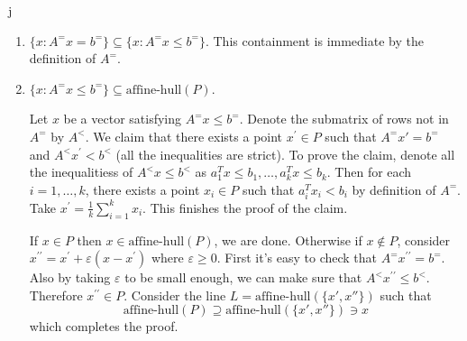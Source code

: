 j\documentclass[11pt]{article}
\renewcommand{\leq}{\leqslant}
\renewcommand{\geq}{\geqslant}
\begin{document}
\begin{enumerate}[1)]
\begin{solution}
\begin{enumerate}
\item $\{x : A^= x = b^=\} \subseteq \{x : A^= x \leq b^=\}$. This containment is immediate by the definition of $A^=$. 

\item $\{x : A^= x \leq b^=\} \subseteq \text{affine-hull}(P)$. 


Let  $x$ be a vector satisfying $ A^= x \leq b^=$. 
Denote the submatrix of rows not in $A^=$ by $A^<$. 
We claim that there exists a point $x^\prime \in P$ such that $A^= x' = b^=$ and $A^< x^\prime < b^<$ (all the inequalities are strict). To prove the claim, denote all the inequalitiess of $A^< x\leq b^<$ as $a_1^T x \leq b_1, \dots, a_k^T x \leq b_k$. Then for each $i = 1, \dots, k$, there exists a point $x_i \in P$ such that $a_i^T x_i < b_i$ by definition of $A^=$. 
Take $x^\prime = \frac{1}{k} \sum_{i=1}^k x_i$. This finishes the proof of the claim.


If $x \in P$ then $x \in \text{affine-hull}(P)$, we are done. 
Otherwise if $x \notin P$, consider $x^{\prime\prime} = x^\prime + \varepsilon(x-x^\prime)$ where $\varepsilon\geq 0$. 
First it's easy to check that $A^= x^{\prime\prime} = b^=$.
Also by taking $\varepsilon$ to be small enough, we can make sure that $A^< x^{\prime\prime} \leq b^<$. Therefore $x^{\prime\prime} \in P$.
Consider the line $L = \text{affine-hull}(\{x', x''\})$ such that $$\text{affine-hull}(P) \supseteq \text{affine-hull}(\{x', x''\}) \ni x$$
which completes the proof.
\end{enumerate}

\end{solution}


\end{enumerate}



  
\end{document}
